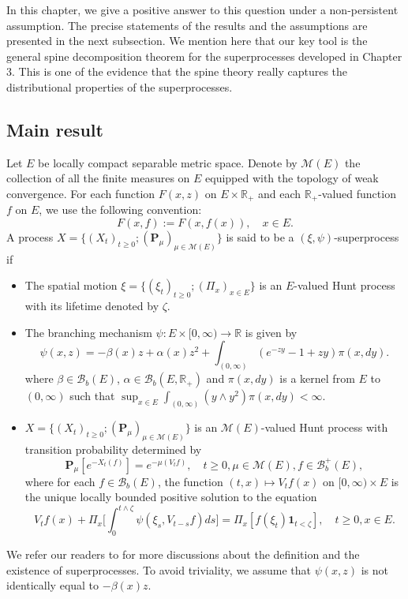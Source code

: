 \documentclass[UTF8]{pkuthss}
\theoremstyle{plain}
\theoremstyle{definition}
\numberwithin{equation}{section}
\begin{document}
    In this chapter, we give a positive answer to this question under a non-persistent assumption.
    The precise statements of the results and the assumptions are presented in the next subsection.
    We mention here that our key tool is the general spine decomposition theorem for the superprocesses developed in Chapter 3. 
    This is one of the evidence that the spine theory really captures the distributional properties of the superprocesses. 

\subsection{Main result}
	
    Let $E$ be locally compact separable metric space. Denote by $\mathcal M(E)$ the collection of all the finite measures on $E$ equipped with the topology of weak convergence.
    For each function $F(x,z)$ on $E\times \mathbb R_+$ and each $\mathbb R_+$-valued function $f$ on $E$, we use the following convention:
\[
    F(x,f):= F(x,f(x)),\quad x\in E.
\]
    A process $X=\{(X_t)_{t\geq 0}; (\mathbf P_\mu)_{\mu \in \mathcal M(E)}\}$ is said to be a $(\xi,\psi)$-superprocess if
\begin{itemize}
\item
    The spatial motion $\xi=\{(\xi_t)_{t\geq 0};(\Pi_x)_{x\in E}\}$ is an $E$-valued Hunt process with its lifetime denoted by $\zeta$.
\item
    The branching mechanism $\psi: E\times[0,\infty) \to \mathbb R$ is given by
\begin{equation}
    \psi(x,z)=
    -\beta(x) z + \alpha (x) z^2 + \int_{(0,\infty)} (e^{-zy} - 1 + zy) \pi(x,dy).
\end{equation}
    where $\beta \in \mathcal B_b(E)$, $\alpha \in \mathcal B_b(E, \mathbb R_+)$ and $\pi(x,dy)$ is a kernel from $E$ to $(0,\infty)$ such that $\sup_{x\in E} \int_{(0,\infty)} (y\wedge y^2) \pi(x,dy) < \infty$.
\item
    $X=\{(X_t)_{t\geq 0}; (\mathbf P_\mu)_{\mu \in \mathcal M(E)}\}$ is an $\mathcal M(E)$-valued Hunt process with transition probability determined by
\begin{equation}
    \mathbf P_\mu [e^{-X_t(f)}] = e^{-\mu(V_tf)},
    \quad t\geq 0, \mu \in \mathcal M(E), f\in \mathcal B^+_b(E),
\end{equation}
    where for each $f\in \mathcal B_b(E)$, the function $(t,x)\mapsto V_tf(x)$ on $[0,\infty) \times E$ is the unique locally bounded positive solution to the equation
\begin{equation}
    V_tf(x) + \Pi_x \Big[  \int_0^{t\wedge \zeta} \psi(\xi_s,V_{t-s}f)ds \Big]
    = \Pi_x [ f(\xi_t)\mathbf 1_{t<\zeta} ],
    \quad t \geq 0, x \in E.
\end{equation}
\end{itemize}
    We refer our readers to \cite{Li2011Measure-valued} for more discussions about the definition and the existence of superprocesses.
    To avoid triviality, we assume that
    $\psi(x,z)$ is not identically equal to $-\beta(x)z$.
\end{document}
